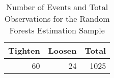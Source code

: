 \begin{table}[ht]
\centering
\caption{Number of Events and Total Observations for the Random Forests Estimation Sample} 
\label{sampsize}
\begin{tabular}{rrr}
  \hline
Tighten & Loosen & Total \\ 
  \hline
 60 &  24 & 1025 \\ 
   \hline
\end{tabular}
\end{table}
